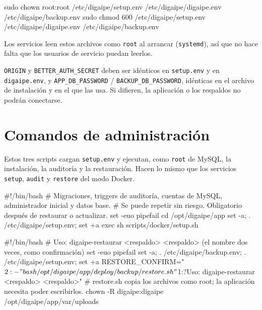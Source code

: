 \begin{codigo}
sudo chown root:root /etc/digaipe/setup.env /etc/digaipe/digaipe.env /etc/digaipe/backup.env
sudo chmod 600 /etc/digaipe/setup.env /etc/digaipe/digaipe.env /etc/digaipe/backup.env
\end{codigo}

Los servicios leen estos archivos como \texttt{root} al arrancar (\texttt{systemd}), así que no
hace falta que los usuarios de servicio puedan leerlos.

\begin{aviso}
	\texttt{ORIGIN} y \texttt{BETTER\_AUTH\_SECRET} deben ser idénticos en \texttt{setup.env} y en
	\texttt{digaipe.env}, y \texttt{APP\_DB\_PASSWORD} / \texttt{BACKUP\_DB\_PASSWORD}, idénticas
	en el archivo de instalación y en el que las usa. Si difieren, la aplicación o los respaldos
	no podrán conectarse.
\end{aviso}

\section{Comandos de administración}

Estos tres scripts cargan \texttt{setup.env} y ejecutan, como \texttt{root} de MySQL, la
instalación, la auditoría y la restauración. Hacen lo mismo que los servicios \texttt{setup},
\texttt{audit} y \texttt{restore} del modo Docker.

\begin{codigo}[label={/usr/local/sbin/digaipe-setup}]
#!/bin/bash
# Migraciones, triggers de auditoría, cuentas de MySQL, administrador inicial y datos base.
# Se puede repetir sin riesgo. Obligatorio después de restaurar o actualizar.
set -euo pipefail
cd /opt/digaipe/app
set -a; . /etc/digaipe/setup.env; set +a
exec sh scripts/docker/setup.sh
\end{codigo}


\begin{codigo}[label={/usr/local/sbin/digaipe-restaurar}]
#!/bin/bash
# Uso: digaipe-restaurar <respaldo> <respaldo>   (el nombre dos veces, como confirmación)
set -euo pipefail
set -a; . /etc/digaipe/backup.env; . /etc/digaipe/setup.env; set +a
RESTORE_CONFIRM="${2:-}" bash /opt/digaipe/app/deploy/backup/restore.sh "${1:?Uso: digaipe-restaurar <respaldo> <respaldo>}"
# restore.sh copia los archivos como root; la aplicación necesita poder escribirlos.
chown -R digaipe:digaipe /opt/digaipe/app/var/uploads
\end{codigo}

